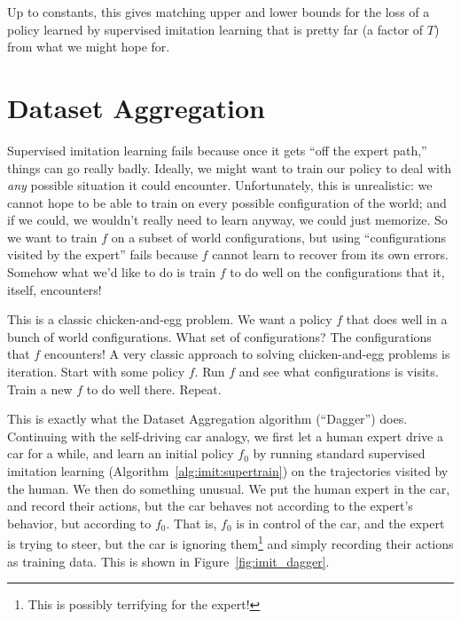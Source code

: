 Up to constants, this gives matching upper and lower bounds for the loss of a policy learned by supervised imitation learning that is pretty far (a factor of $T$) from what we might hope for.

\section{Dataset Aggregation}

Supervised imitation learning fails because once it gets ``off the expert path,'' things can go really badly.
Ideally, we might want to train our policy to deal with \emph{any} possible situation it could encounter.
Unfortunately, this is unrealistic: we cannot hope to be able to train on every possible configuration of the world; and if we could, we wouldn't really need to learn anyway, we could just memorize.
So we want to train $f$ on a subset of world configurations, but using ``configurations visited by the expert'' fails because $f$ cannot learn to recover from its own errors.
Somehow what we'd like to do is train $f$ to do well on the configurations that it, itself, encounters!

This is a classic chicken-and-egg problem.
We want a policy $f$ that does well in a bunch of world configurations.
What set of configurations?
The configurations that $f$ encounters!
A very classic approach to solving chicken-and-egg problems is iteration.
Start with some policy $f$.
Run $f$ and see what configurations is visits.
Train a new $f$ to do well there.
Repeat.

This is exactly what the Dataset Aggregation algorithm (``Dagger'') does.
Continuing with the self-driving car analogy, we first let a human expert drive a car for a while, and learn an initial policy $f_0$ by running standard supervised imitation learning (Algorithm~\ref{alg:imit:supertrain}) on the trajectories visited by the human.
We then do something unusual.
We put the human expert in the car, and record their actions, but the car behaves not according to the expert's behavior, but according to $f_0$.
That is, $f_0$ is in control of the car, and the expert is trying to steer, but the car is ignoring them\footnote{This is possibly terrifying for the expert!} and simply recording their actions as training data.
This is shown in Figure~\ref{fig:imit_dagger}.



